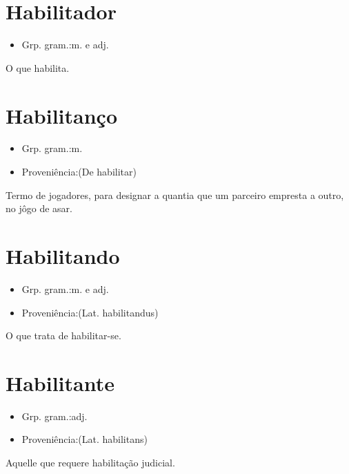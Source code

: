\documentclass{article}
\begin{document}
\section{Habilitador}
\begin{itemize}
\item {Grp. gram.:m.  e  adj.}
\end{itemize}
O que habilita.
\section{Habilitanço}
\begin{itemize}
\item {Grp. gram.:m.}
\end{itemize}
\begin{itemize}
\item {Proveniência:(De \textunderscore habilitar\textunderscore )}
\end{itemize}
Termo de jogadores, para designar a quantia que um parceiro empresta a outro, no jôgo de asar.
\section{Habilitando}
\begin{itemize}
\item {Grp. gram.:m.  e  adj.}
\end{itemize}
\begin{itemize}
\item {Proveniência:(Lat. \textunderscore habilitandus\textunderscore )}
\end{itemize}
O que trata de habilitar-se.
\section{Habilitante}
\begin{itemize}
\item {Grp. gram.:adj.}
\end{itemize}
\begin{itemize}
\item {Proveniência:(Lat. \textunderscore habilitans\textunderscore )}
\end{itemize}
Aquelle que requere habilitação judicial.
\end{document}
